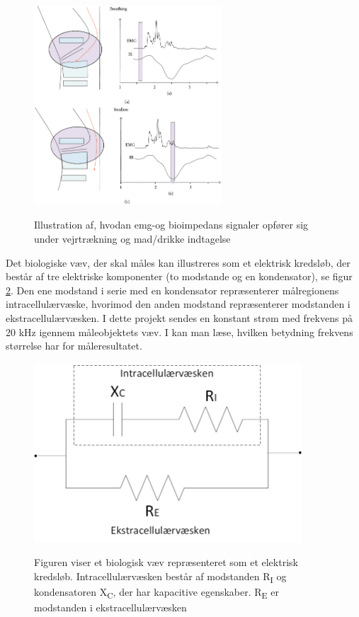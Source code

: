 \begin{figure}[H]
\centering
{\includegraphics[width=7cm]
{Figure/EMGBIGraph}}
\caption{Illustration af, hvodan emg-og bioimpedans signaler opfører sig under vejrtrækning og mad/drikke indtagelse\cite{Schultheiss2014}}
\label{EMGBIGraph} 
\end{figure}
\pagebreak

Det biologiske væv, der skal måles kan illustreres som et elektrisk kredsløb, der består af tre elektriske komponenter (to modstande og en kondensator), se figur \ref{fig:vaevsmodel}. Den ene modstand i serie med en kondensator repræsenterer målregionens intracellulærvæske, hvorimod den anden modstand repræsenterer modstanden i ekstracellulærvæsken. I dette projekt sendes en konstant strøm med frekvens på 20 kHz igennem måleobjektets væv. I  kan man læse, hvilken betydning frekvens størrelse har for måleresultatet. 
\begin{figure}[H]
\centering
{\includegraphics[width=10cm]
{Figure/vaevsmodel}}
\caption{Figuren viser et biologisk væv repræsenteret som et elektrisk kredsløb. Intracellulærvæsken består af modstanden  R\textsubscript{I} og kondensatoren X\textsubscript{C}, der har kapacitive egenskaber. R\textsubscript{E} er modstanden i ekstracellulærvæsken}
\label{fig:vaevsmodel}
\end{figure}

